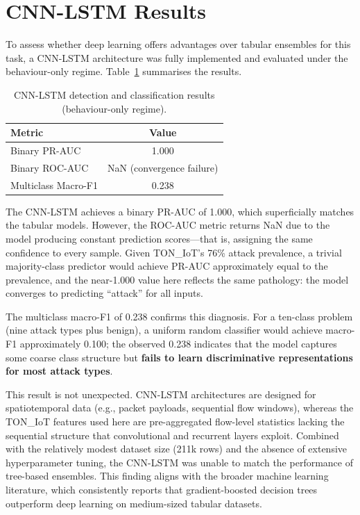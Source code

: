 \documentclass[12pt,a4paper]{report}
\begin{document}
\section{CNN-LSTM Results}
\label{sec:cnnlstm-results}

To assess whether deep learning offers advantages over tabular ensembles for this task, a CNN-LSTM architecture was fully implemented and evaluated under the behaviour-only regime. Table~\ref{tab:cnnlstm} summarises the results.

\begin{table}[H]
\centering
\caption{CNN-LSTM detection and classification results (behaviour-only regime).}
\label{tab:cnnlstm}
\begin{tabular}{lc}
\toprule
\textbf{Metric} & \textbf{Value} \\
\midrule
Binary PR-AUC & 1.000 \\
Binary ROC-AUC & NaN (convergence failure) \\
Multiclass Macro-F1 & 0.238 \\
\bottomrule
\end{tabular}
\end{table}

The CNN-LSTM achieves a binary PR-AUC of 1.000, which superficially matches the tabular models. However, the ROC-AUC metric returns NaN due to the model producing constant prediction scores---that is, assigning the same confidence to every sample. Given TON\_IoT's 76\% attack prevalence, a trivial majority-class predictor would achieve PR-AUC approximately equal to the prevalence, and the near-1.000 value here reflects the same pathology: the model converges to predicting ``attack'' for all inputs.

The multiclass macro-F1 of 0.238 confirms this diagnosis. For a ten-class problem (nine attack types plus benign), a uniform random classifier would achieve macro-F1 approximately 0.100; the observed 0.238 indicates that the model captures some coarse class structure but \textbf{fails to learn discriminative representations for most attack types}.

This result is not unexpected. CNN-LSTM architectures are designed for spatiotemporal data (e.g., packet payloads, sequential flow windows), whereas the TON\_IoT features used here are pre-aggregated flow-level statistics lacking the sequential structure that convolutional and recurrent layers exploit. Combined with the relatively modest dataset size (211k rows) and the absence of extensive hyperparameter tuning, the CNN-LSTM was unable to match the performance of tree-based ensembles. This finding aligns with the broader machine learning literature, which consistently reports that gradient-boosted decision trees outperform deep learning on medium-sized tabular datasets.
\end{document}
